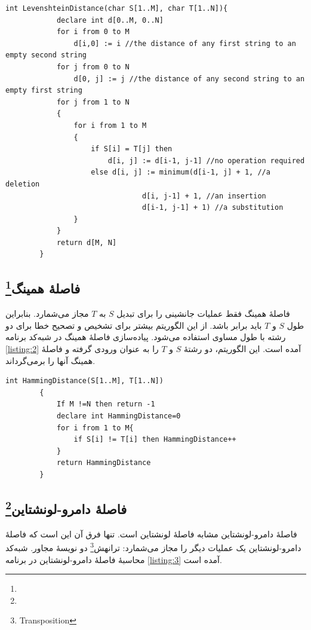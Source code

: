 \documentclass[12pt,onecolumn,a4paper]{article}
\begin{document}
    \begin{LTR}
        \begin{lstlisting}[style=C++Style,caption=\rl{شبه‌کد فاصلۀ لونشتاین}, label={listing:1}]
        int LevenshteinDistance(char S[1..M], char T[1..N]){
            declare int d[0..M, 0..N]
            for i from 0 to M
                d[i,0] := i //the distance of any first string to an empty second string
            for j from 0 to N
                d[0, j] := j //the distance of any second string to an empty first string
            for j from 1 to N
            {
                for i from 1 to M
                {
                    if S[i] = T[j] then
                        d[i, j] := d[i-1, j-1] //no operation required
                    else d[i, j] := minimum(d[i-1, j] + 1, //a deletion
                                d[i, j-1] + 1, //an insertion
                                d[i-1, j-1] + 1) //a substitution
                }
            }
            return d[M, N]
        }
        \end{lstlisting}
    \end{LTR}

    \subsection{فاصلۀ همینگ\protect\footnote{}}
    فاصلۀ همینگ  فقط عملیات جانشینی را برای تبدیل $S$ به $T$ مجاز می‌شمارد. بنابراین طول $S$ و $T$ باید برابر باشد. از این الگوریتم بیشتر برای تشخیص و تصحیح خطا برای دو رشته با طول مساوی استفاده می‌شود. پیاده‌سازی فاصلۀ همینگ در شبه‌کد برنامه \ref{listing:2} آمده است. این الگوریتم، دو رشتۀ $S$ و $T$ را به عنوان ورودی گرفته و فاصلۀ همینگ آنها را برمی‌گرداند.

    \begin{LTR}
        \begin{lstlisting}[style=C++Style,caption=\rl{شبه‌کد فاصلۀ همینگ}, label={listing:2}]
        int HammingDistance(S[1..M], T[1..N])
        {
            If M !=N then return -1
            declare int HammingDistance=0
            for i from 1 to M{
                if S[i] != T[i] then HammingDistance++
            }
            return HammingDistance
        }
        \end{lstlisting}
    \end{LTR}

    \subsection{فاصلۀ دامرو-لونشتاین\protect\footnote{}}
    فاصلۀ دامرو-لونشتاین  مشابه فاصلۀ لونشتاین است. تنها فرق آن این است که فاصلۀ دامرو-لونشتاین یک عملیات دیگر را مجاز می‌شمارد: ترانهش\footnote{Transposition}  دو نویسۀ مجاور. شبه‌کد محاسبۀ فاصلۀ دامرو-لونشتاین در برنامه \ref{listing:3} آمده است.
\end{document}
